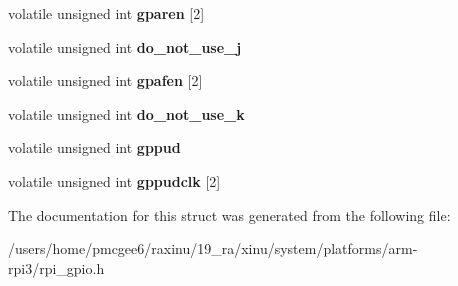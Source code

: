 \begin{DoxyCompactItemize}
\item 
\hypertarget{structrpi__gpio__regs_a8c8d39b789aecd0808b922cf9c3916f4}{volatile unsigned int {\bfseries gparen} \mbox{[}2\mbox{]}}\label{structrpi__gpio__regs_a8c8d39b789aecd0808b922cf9c3916f4}

\item 
\hypertarget{structrpi__gpio__regs_a07298f562e55c1eff89d5a48a967f4a7}{volatile unsigned int {\bfseries do\-\_\-not\-\_\-use\-\_\-j}}\label{structrpi__gpio__regs_a07298f562e55c1eff89d5a48a967f4a7}

\item 
\hypertarget{structrpi__gpio__regs_adb3b7a08016cd1a966fcb9cdb81c1137}{volatile unsigned int {\bfseries gpafen} \mbox{[}2\mbox{]}}\label{structrpi__gpio__regs_adb3b7a08016cd1a966fcb9cdb81c1137}

\item 
\hypertarget{structrpi__gpio__regs_a2ced922f53052709dba4b39d0bbc0370}{volatile unsigned int {\bfseries do\-\_\-not\-\_\-use\-\_\-k}}\label{structrpi__gpio__regs_a2ced922f53052709dba4b39d0bbc0370}

\item 
\hypertarget{structrpi__gpio__regs_ab73d696b26c56c3575ecba113e0b4450}{volatile unsigned int {\bfseries gppud}}\label{structrpi__gpio__regs_ab73d696b26c56c3575ecba113e0b4450}

\item 
\hypertarget{structrpi__gpio__regs_a7e06606186861439d13f01e27a27b569}{volatile unsigned int {\bfseries gppudclk} \mbox{[}2\mbox{]}}\label{structrpi__gpio__regs_a7e06606186861439d13f01e27a27b569}

\end{DoxyCompactItemize}


The documentation for this struct was generated from the following file\-:\begin{DoxyCompactItemize}
\item 
/users/home/pmcgee6/raxinu/19\-\_\-ra/xinu/system/platforms/arm-\/rpi3/rpi\-\_\-gpio.\-h\end{DoxyCompactItemize}
